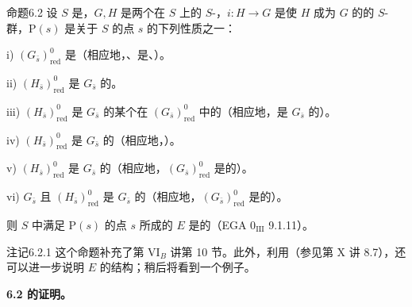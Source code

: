 \begin{SGAresult}{命题}{6.2}
设 $S$ 是，$G,H$ 是两个在 $S$ 上的 $S$-，$i:H\to G$ 是使 $H$ 成为 $G$ 的的 $S$-群，$\mathrm P(s)$ 是关于 $S$ 的点 $s$ 的下列性质之一：

i) $(G_{\bar s})_{\mathrm{red}}^0$ 是（相应地，、是、）。

ii) $(H_{\bar s})_{\mathrm{red}}^0$ 是 $G_{\bar s}$ 的。

iii) $(H_{\bar s})_{\mathrm{red}}^0$ 是 $G_{\bar s}$ 的某个在 $(G_{\bar s})_{\mathrm{red}}^0$ 中的（相应地，是 $G_{\bar s}$ 的）。

iv) $(H_{\bar s})_{\mathrm{red}}^0$ 是 $G_{\bar s}$ 的（相应地，）。

v) $(H_{\bar s})_{\mathrm{red}}^0$ 是 $G_{\bar s}$ 的（相应地，$(G_{\bar s})_{\mathrm{red}}^0$ 是的）。

vi) $G_{\bar s}$ 且 $(H_{\bar s})_{\mathrm{red}}^0$ 是 $G_{\bar s}$ 的（相应地，$(G_{\bar s})_{\mathrm{red}}^0$ 是的）。

则 $S$ 中满足 $\mathrm P(s)$ 的点 $s$ 所成的 $E$ 是的（EGA 0$_{\mathrm{III}}$ 9.1.11）。
\end{SGAresult}
\begin{SGAresult}{注记}{6.2.1}
这个命题补充了第 VI$_B$ 讲第 10 节。此外，利用（参见第 X 讲 8.7），还可以进一步说明 $E$ 的结构；稍后将看到一个例子。
\end{SGAresult}
\textbf{6.2 的证明。}

